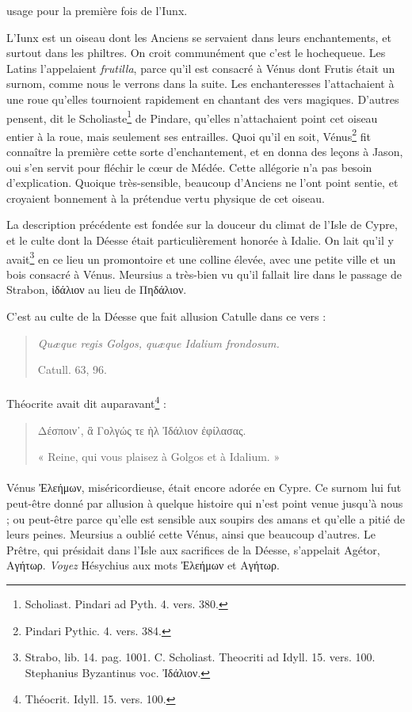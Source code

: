 \documentclass[a4paper, 11pt, oneside, polutonikogreek, french]{article}
\begin{document}
usage pour la première fois de l'Iunx.

L'Iunx est un oiseau dont les Anciens se servaient dans leurs enchantements, et surtout dans les philtres. On croit communément que c'est le hochequeue. Les Latins l'appelaient \emph{frutilla}, parce qu'il est consacré à Vénus dont Frutis était un surnom, comme nous le verrons dans la suite. Les enchanteresses l'attachaient à une roue qu'elles tournoient rapidement en chantant des vers magiques. D'autres pensent, dit le Scholiaste\footnote{Scholiast. Pindari ad Pyth. 4. vers. 380.} de Pindare, qu'elles n'attachaient point cet oiseau entier à la roue, mais seulement ses entrailles. Quoi qu'il en soit, Vénus\footnote{Pindari Pythic. 4. vers. 384.} fit connaître la première cette sorte d'enchantement, et en donna des leçons à Jason, oui s'en servit pour fléchir le cœur de Médée. Cette allégorie n'a pas besoin d'explication. Quoique très-sensible, beaucoup d'Anciens ne l'ont point sentie, et croyaient bonnement à la prétendue vertu physique de cet oiseau.

La description précédente est fondée sur la douceur du climat de l'Isle de Cypre, et le culte dont la Déesse était particulièrement honorée à Idalie. On lait qu'il y avait\footnote{Strabo, lib. 14. pag. 1001. C. Scholiast. Theocriti ad Idyll. 15. vers. 100. Stephanius Byzantinus voc. Ἰδάλιον.} en ce lieu un promontoire et une colline élevée, avec une petite ville et un bois consacré à Vénus. Meursius a très-bien vu qu'il fallait lire dans le passage de Strabon, ἰδάλιον au lieu de Πηδάλιον.

C'est au culte de la Déesse que fait allusion Catulle dans ce vers :
\begin{quotation}
\emph{Quæque regis Golgos, quæque Idalium frondosum.}

\hspace*{30mm}Catull. 63, 96.
\end{quotation}
\paragraph{}
Théocrite avait dit auparavant\footnote{Théocrit. Idyll. 15. vers. 100.} :
\begin{quotation}
Δέσποιν᾽, ἃ Γολγώς τε ὴλ Ἰδάλιον ἐφίλασας.

« Reine, qui vous plaisez à Golgos et à Idalium. » 
\end{quotation}
\paragraph{}
Vénus Ἐλεήμων, miséricordieuse, était encore adorée en Cypre. Ce surnom lui fut peut-être donné par allusion à quelque histoire qui n'est point venue jusqu'à nous ; ou peut-être parce qu'elle est sensible aux soupirs des amans et qu'elle a pitié de leurs peines. Meursius a oublié cette Vénus, ainsi que beaucoup d'autres. Le Prêtre, qui présidait dans l'Isle aux sacrifices de la Déesse, s'appelait Agétor, Αγήτωρ. \emph{Voyez} Hésychius aux mots Ἐλεήμων et Αγήτωρ.
\end{document}
